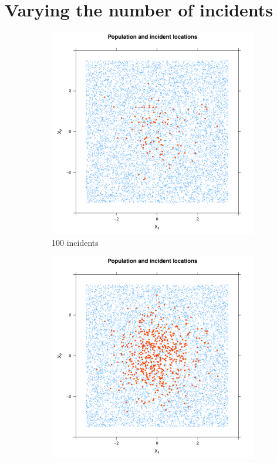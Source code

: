 \section{Varying the number of incidents}
\label{sec:results:unif_NCases_1h}

\begin{figure}[htbp]
    \centering
    \begin{subfigure}{0.45\textwidth}
    \includegraphics[width=\textwidth]{results/unif_100_1_1h/output/population_and_incidents_scatter}
    \caption{100 incidents}
    \end{subfigure}
    \begin{subfigure}{0.45\textwidth}
    \includegraphics[width=\textwidth]{results/unif_500_1_1h/output/population_and_incidents_scatter}

\end{subfigure}
\end{figure}
